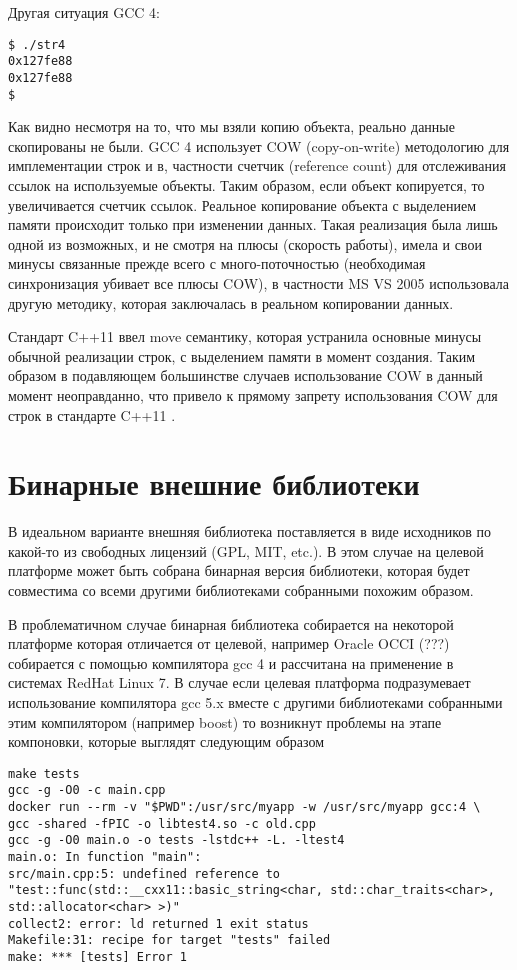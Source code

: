 \documentclass[14pt,a4paper]{article}
\begin{document}
Другая ситуация GCC 4:
\begin{verbatim}
$ ./str4
0x127fe88
0x127fe88
$
\end{verbatim}

Как видно несмотря на то, что мы взяли копию объекта, реально данные
скопированы не были. GCC 4 использует COW (copy-on-write) методологию
для имплементации строк и в, частности счетчик (reference count) для
отслеживания ссылок на используемые объекты. Таким образом, если объект
копируется, то увеличивается счетчик ссылок. Реальное копирование
объекта с выделением памяти происходит только при изменении данных.
Такая реализация была 
лишь одной из возможных, и не смотря на плюсы (скорость работы), имела
и свои минусы связанные прежде всего с много-поточностью (необходимая
синхронизация убивает все плюсы COW), в частности MS VS 2005
использовала другую методику, которая заключалась в реальном
копировании данных. 

Стандарт C++11 ввел move семантику, которая устранила основные
минусы обычной реализации строк, с выделением памяти в момент
создания. Таким образом в подавляющем большинстве случаев
использование COW в данный момент неоправданно, что привело к прямому
запрету использования COW для строк в стандарте C++11
\cite{ISO:2012:III}. 

\section{Бинарные внешние библиотеки}

В идеальном варианте внешняя библиотека поставляется в виде исходников
по какой-то из свободных лицензий (GPL, MIT, etc.). В этом случае на
целевой платформе может быть собрана бинарная версия библиотеки,
которая будет совместима со всеми другими библиотеками собранными
похожим образом. 

В проблематичном случае бинарная библиотека собирается на некоторой
платформе которая отличается от целевой, например Oracle OCCI (???)
собирается с помощью компилятора gcc 4 и рассчитана на применение в
системах RedHat Linux 7. В случае если целевая платформа подразумевает
использование компилятора gcc 5.x вместе с другими библиотеками
собранными этим компилятором (например boost) то возникнут проблемы
на этапе компоновки, которые выглядят следующим образом

\begin{verbatim}
make tests
gcc -g -O0 -c main.cpp 
docker run --rm -v "$PWD":/usr/src/myapp -w /usr/src/myapp gcc:4 \
gcc -shared -fPIC -o libtest4.so -c old.cpp
gcc -g -O0 main.o -o tests -lstdc++ -L. -ltest4
main.o: In function "main":
src/main.cpp:5: undefined reference to 
"test::func(std::__cxx11::basic_string<char, std::char_traits<char>, 
std::allocator<char> >)"
collect2: error: ld returned 1 exit status
Makefile:31: recipe for target "tests" failed
make: *** [tests] Error 1
\end{verbatim}
\end{document}
